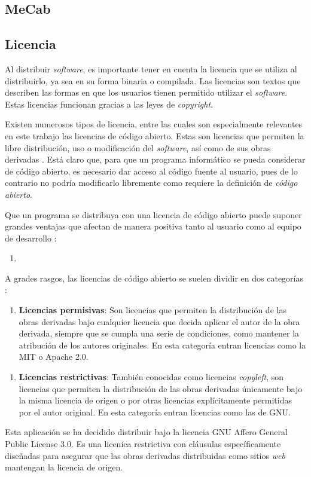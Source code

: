 \subsection{MeCab}

\subsection{Licencia}

Al distribuir \textit{software}, es importante tener en cuenta la licencia que se utiliza al distribuirlo, ya sea en su forma binaria o compilada. Las licencias son textos que describen las formas en que los usuarios tienen permitido utilizar el \textit{software}. Estas licencias funcionan gracias a las leyes de \textit{copyright}.

Existen numerosos tipos de licencia, entre las cuales son especialmente relevantes en este trabajo las licencias de código abierto. Estas son licencias que permiten la libre distribución, uso o modificación del \textit{software}, así como de sus obras derivadas \citationNeeded. Está claro que, para que un programa informático se pueda considerar de código abierto, es necesario dar acceso al código fuente al usuario, pues de lo contrario no podría modificarlo libremente como requiere la definición de \textit{código abierto}.

Que un programa se distribuya con una licencia de código abierto puede suponer grandes ventajas que afectan de manera positiva tanto al usuario como al equipo de desarrollo \citationNeeded:

\begin{enumerate}
	\item 
\end{enumerate}

A grades rasgos, las licencias de código abierto se suelen dividir en dos categorías \citationNeeded:

\begin{enumerate}
	\item \textbf{Licencias permisivas}: Son licencias que permiten la distribución de las obras derivadas bajo cualquier licencia que decida aplicar el autor de la obra derivada, siempre que se cumpla una serie de condiciones, como mantener la atribución de los autores originales. En esta categoría entran licencias como la MIT o Apache 2.0.
\end{enumerate}

\begin{enumerate}
	\item \textbf{Licencias restrictivas}: También conocidas como licencias \textit{copyleft}, son licencias que permiten la distribución de las obras derivadas únicamente bajo la misma licencia de origen o por otras licencias explícitamente permitidas por el autor original. En esta categoría entran licencias como las de GNU.
\end{enumerate}

Esta aplicación se ha decidido distribuir bajo la licencia GNU Affero General Public License 3.0. Es una licenica restrictiva con cláusulas específicamente diseñadas para asegurar que las obras derivadas distribuidas como sitios \textit{web} mantengan la licencia de origen.
